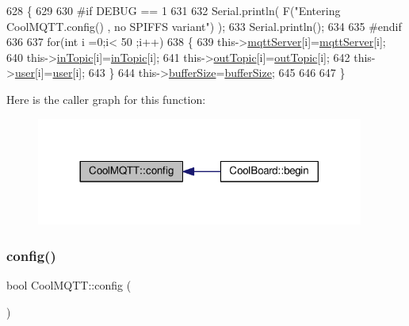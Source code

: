 \begin{DoxyCode}
628 \{
629 
630 \textcolor{preprocessor}{#if DEBUG == 1}
631 
632     Serial.println( F(\textcolor{stringliteral}{"Entering CoolMQTT.config() , no SPIFFS variant"}) );
633     Serial.println();
634 
635 \textcolor{preprocessor}{#endif}
636 
637     \textcolor{keywordflow}{for}(\textcolor{keywordtype}{int} i =0;i< 50 ;i++)
638     \{
639         this->\hyperlink{class_cool_m_q_t_t_ab8bb951f87ddbf92db74c2ad16a3e53e}{mqttServer}[i]=\hyperlink{class_cool_m_q_t_t_ab8bb951f87ddbf92db74c2ad16a3e53e}{mqttServer}[i];
640         this->\hyperlink{class_cool_m_q_t_t_a4492f52a441e83cc5151010317fdb52d}{inTopic}[i]=\hyperlink{class_cool_m_q_t_t_a4492f52a441e83cc5151010317fdb52d}{inTopic}[i];
641         this->\hyperlink{class_cool_m_q_t_t_a109c786a17b463f9eeba046194279522}{outTopic}[i]=\hyperlink{class_cool_m_q_t_t_a109c786a17b463f9eeba046194279522}{outTopic}[i];
642         this->\hyperlink{class_cool_m_q_t_t_a8cd47e45d457f908d4b4390b35aaee83}{user}[i]=\hyperlink{class_cool_m_q_t_t_a8cd47e45d457f908d4b4390b35aaee83}{user}[i];
643     \}
644     this->\hyperlink{class_cool_m_q_t_t_a7f3cf26b51d6770f216e42c5ef13ca9f}{bufferSize}=\hyperlink{class_cool_m_q_t_t_a7f3cf26b51d6770f216e42c5ef13ca9f}{bufferSize};
645     
646 
647 \}
\end{DoxyCode}
Here is the caller graph for this function\+:\nopagebreak
\begin{figure}[H]
\begin{center}
\leavevmode
\includegraphics[width=305pt]{d0/dd0/class_cool_m_q_t_t_a9b703de4f1358f0ee7a5e8c44979c648_icgraph}
\end{center}
\end{figure}
\mbox{\label{class_cool_m_q_t_t_a6571671781a505feca9a8a56e256c6bc}} 
\subsubsection{\texorpdfstring{config()}{config()}\hspace{0.1cm}{\footnotesize\ttfamily [2/2]}}
{\footnotesize\ttfamily bool Cool\+M\+Q\+T\+T\+::config (\begin{DoxyParamCaption}{ }\end{DoxyParamCaption})}

